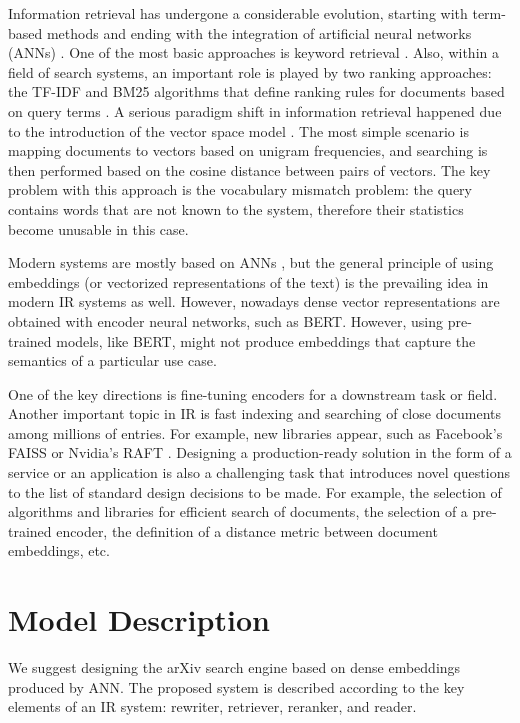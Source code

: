 \documentclass{article}
\begin{document}
    Information retrieval has undergone a considerable evolution, starting with term-based methods and ending with the integration of artificial neural networks (ANNs) \cite{zhu2023large}. One of the most basic approaches is keyword retrieval \cite{salton1988term}. Also, within a field of search systems, an important role is played by two ranking approaches: the TF-IDF and BM25 algorithms that define ranking rules for documents based on query terms \cite{robertson1995okapi}. A serious paradigm shift in information retrieval happened due to the introduction of the vector space model \cite{salton1975vector}. The most simple scenario is mapping documents to vectors based on unigram frequencies, and searching is then performed based on the cosine distance between pairs of vectors. The key problem with this approach is the vocabulary mismatch problem: the query contains words that are not known to the system, therefore their statistics become unusable in this case. 
    
    Modern systems are mostly based on ANNs \cite{lin2022pretrained}, but the general principle of using embeddings (or vectorized representations of the text) is the prevailing idea in modern IR systems as well. However, nowadays dense vector representations are obtained with encoder neural networks, such as BERT. However, using pre-trained models, like BERT, might not produce embeddings that capture the semantics of a particular use case. 
    
    One of the key directions is fine-tuning encoders for a downstream task or field. Another important topic in IR is fast indexing and searching of close documents among millions of entries. For example, new libraries appear, such as Facebook's FAISS \cite{faiss} or Nvidia's RAFT \cite{raft}. Designing a production-ready solution in the form of a service or an application is also a challenging task that introduces novel questions to the list of standard design decisions to be made. For example, the selection of algorithms and libraries for efficient search of documents, the selection of a pre-trained encoder, the definition of a distance metric between document embeddings, etc. 

\section{Model Description}\label{sec:methodology}
    We suggest designing the arXiv search engine based on dense embeddings produced by ANN. The proposed system is described according to the key elements of an IR system: rewriter, retriever, reranker, and reader.
    
\end{document}
